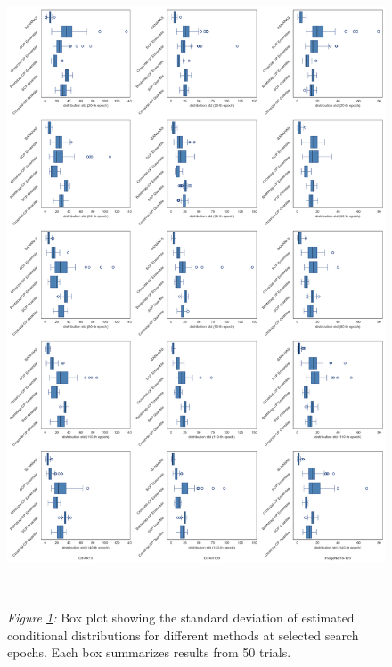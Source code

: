 \documentclass[a4paper,oneside,bibliography=totoc]{scrbook}
\begin{document}
	\vspace{0.7em}
	\begin{figure}[htbp]
		\centering
		\includegraphics[scale=0.4 ]{figs/boxplot.png}
		\label{fig: boxplot}
		\\
 		\parbox{\linewidth}{
 		\vspace{1em}
  		{\small \textit{Figure \ref{fig: boxplot}:} Box plot showing the standard deviation of estimated conditional distributions for different methods at selected search epochs. Each box summarizes results from 50 trials.}
 	 }	
	\end{figure}	
\end{document}
